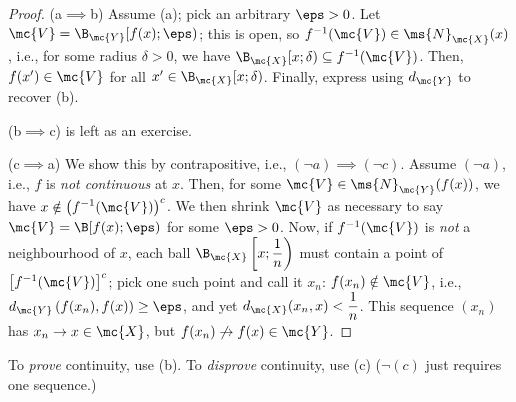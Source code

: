 \begin{proof}
	(a\(\implies\)b) Assume (a); pick an arbitrary \(\eps>0\). Let \(\mc{V}=\B_{\mc{Y}}[f(x);\eps)\); this is open, so \(f^{-1}(\mc{V})\in\ms{N}_{\mc{X}}(x)\), i.e., for some radius \(\delta>0\), we have \(\B_{\mc{X}}[x;\delta)\subseteq f^{-1}(\mc{V})\). Then, \(f(x')\in\mc{V}\) for all \(x'\in\B_{\mc{X}}[x;\delta)\). Finally, express using \(d_{\mc{Y}}\) to recover (b).
	
	\medskip
	
	(b\(\implies\)c) is left as an exercise.
	
	\medskip
	
	(c\(\implies\)a) We show this by contrapositive, i.e., \((\lnot a)\implies (\lnot c)\). Assume \((\lnot a)\), i.e., \(f\) is \emph{not continuous} at \(x\). Then, for some \(\mc{V}\in\ms{N}_{\mc{Y}}(f(x))\), we have \(x\notin \displaystyle\left(f^{-1}(\mc{V})\right)^{c}\). We then shrink \(\mc{V}\) as necessary to say \(\mc{V}=\B[f(x);\eps)\) for some \(\eps>0\). Now, if \(f^{-1}(\mc{V})\) is \emph{not} a neighbourhood of \(x\), each ball \(\B_{\mc{X}}\left[x;\displaystyle\frac{1}{n}\right)\) must contain a point of \(\left[f^{-1}(\mc{V})\right]^c\); pick one such point and call it \(x_n\): \(f(x_n)\notin\mc{V}\), i.e., \(d_{\mc{Y}}\left(f(x_n),f(x)\right)\geq\eps\), and yet \(d_{\mc{X}}(x_n,x)<\displaystyle\frac{1}{n}\). This sequence \((x_n)\) has \(x_n\to x\in\mc{X}\), but \(f(x_n)\not\to f(x)\in\mc{Y}\). 
\end{proof}
\begin{note}
	To \emph{prove} continuity, use (b). To \emph{disprove} continuity, use (c) (\(\lnot(c)\) just requires one sequence.)
\end{note}